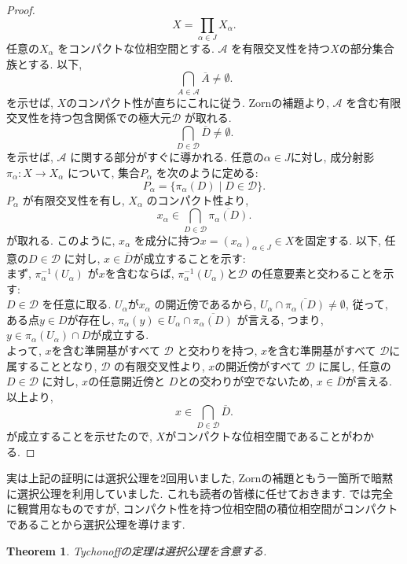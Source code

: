 \documentclass[lualatex]{ltjsbook}
\newcommand{\cl}[1]{\overline{ #1}  }
\newtheorem{theorem}{Theorem}[section]
\theoremstyle{remark}
\theoremstyle{plain}
\begin{document}
\begin{proof}
	\[
	X = \prod_{\alpha \in J} X_{\alpha}  
	.\] 
	任意の$X_{\alpha}$ をコンパクトな位相空間とする. $\mathcal{A}$ を有限交叉性を持つ$X$の部分集合族とする. 以下,
	 \[
	 \bigcap_{A \in \mathcal{A}} \cl{A} \neq \emptyset
	 .\] 
	 を示せば, $X$のコンパクト性が直ちにこれに従う.
	 Zornの補題より, $\mathcal{A}$ を含む有限交叉性を持つ包含関係での極大元$\mathcal{D}$ が取れる. 
	 \[
		 \bigcap_{D \in  \mathcal{D}} \cl{D} \neq \emptyset
	 .\] 
	 を示せば, $\mathcal{A}$ に関する部分がすぐに導かれる.
	 任意の$\alpha \in  J$に対し, 成分射影$\pi_{\alpha}: X \to X _{\alpha}$ について, 集合$P_{\alpha}$ を次のように定める: 
	 \[
	 P_{\alpha }= \{\pi_{\alpha} \left( D \right)  \mid  D \in \mathcal{D}\} 
	 .\] 
	 $P_{\alpha}$ が有限交叉性を有し, $X_{\alpha}$ のコンパクト性より, 
	  \[
		  x_{\alpha} \in \bigcap_{D \in \mathcal{D}} \cl{\pi_{\alpha}(D)}
	 .\] 
	 が取れる.
 このように, $x_{\alpha}$ を成分に持つ$x = \left( x_{\alpha} \right) _{\alpha \in  J} \in X$を固定する.
 以下, 任意の$D \in \mathcal{D}$ に対し, $x \in \cl{D}$が成立することを示す:\\
 まず,  $\pi_{\alpha}^{-1}(U_{\alpha})$ が$x$を含むならば,  $\pi_{\alpha}^{-1}(U_{\alpha})$と$\mathcal{D}$ の任意要素と交わることを示す:\\
  $D \in  \mathcal{D}$ を任意に取る. $U _{\alpha}$が$x _{\alpha}$ の開近傍であるから, 
  $U_{\alpha} \cap \cl{\pi_{\alpha}{(D)}} \neq \emptyset$, 従って, ある点$y \in D$が存在し,  $\pi_{\alpha} (y) \in U_{\alpha} \cap \cl{\pi_{\alpha}{(D)}}$ が言える, つまり, $y \in \pi_{\alpha}(U_{\alpha}) \cap D$が成立する.\\
  よって, $x$を含む準開基がすべて $\mathcal{D}$ と交わりを持つ, $x$を含む準開基がすべて $\mathcal{D}$に属することとなり, $\mathcal{D}$ の有限交叉性より, $x$の開近傍がすべて $\mathcal{D}$ に属し, 任意の$D \in \mathcal{D}$ に対し, $x$の任意開近傍と $D$との交わりが空でないため,  $x \in \cl{D}$が言える.
  以上より, 
   \[
	   x \in \bigcap_{D \in \mathcal{D}} \cl{D} 
  .\] 
  が成立することを示せたので, $X$がコンパクトな位相空間であることがわかる.

\end{proof}

実は上記の証明には選択公理を2回用いました, Zornの補題ともう一箇所で暗黙に選択公理を利用していました. これも読者の皆様に任せておきます. では完全に観賞用なものですが, コンパクト性を持つ位相空間の積位相空間がコンパクトであることから選択公理を導けます.

\begin{theorem}
	Tychonoffの定理は選択公理を含意する.
\end{theorem}
\end{document}
